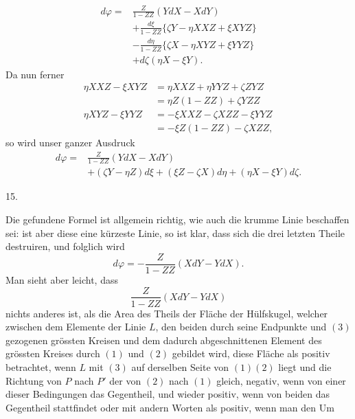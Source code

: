 %
\[
\begin{aligned}
d\varphi={}&\frac{Z}{1-ZZ}(YdX-XdY)\\
&+\frac{d\xi}{1-ZZ}\{\zeta Y-\eta XXZ+\xi XYZ\}\\
&-\frac{d\eta}{1-ZZ}\{\zeta X-\eta XYZ+\xi YYZ\}\\
&+d\zeta(\eta X-\xi Y).
\end{aligned}
\]
Da nun ferner
\[
\begin{aligned}
\eta XXZ-\xi XYZ&=\eta XXZ+\eta YYZ+\zeta ZYZ\\
&=\eta Z(1-ZZ)+\zeta YZZ\\
\eta XYZ-\xi YYZ&=-\xi XXZ-\zeta XZZ-\xi YYZ\\
&=-\xi Z(1-ZZ)-\zeta XZZ,
\end{aligned}
\]
so wird unser ganzer Ausdruck
\[
\begin{aligned}
d\varphi={}&\frac{Z}{1-ZZ}(YdX-XdY)\\
&+(\zeta Y-\eta Z)d\xi+(\xi Z-\zeta X)d\eta+(\eta X-\xi Y)d\zeta.
\end{aligned}
\]

\begin{center}15.\end{center}
\noindent\hspace*{1.2em}Die gefundene Formel ist allgemein richtig, wie auch die krumme Linie beschaffen sei: ist aber diese eine kürzeste Linie, so ist klar, dass sich die drei letzten Theile destruiren, und folglich wird
\[
d\varphi=-\frac{Z}{1-ZZ}(XdY-YdX).
\]
Man sieht aber leicht, dass
\[
\frac{Z}{1-ZZ}(XdY-YdX)
\]
nichts anderes ist, als die Area des Theils der Fläche der Hülfskugel, welcher zwischen dem Elemente der Linie $L$, den beiden durch seine Endpunkte und $(3)$ gezogenen grössten Kreisen und dem dadurch abgeschnittenen Element des grössten Kreises durch $(1)$ und $(2)$ gebildet wird, diese Fläche als positiv betrachtet, wenn $L$ mit $(3)$ auf derselben Seite von $(1)(2)$ liegt und die Richtung von $P$ nach $P'$ der von $(2)$ nach $(1)$ gleich, negativ, wenn von einer dieser Bedingungen das Gegentheil, und wieder positiv, wenn von beiden das Gegentheil stattfindet oder mit andern Worten als positiv, wenn man den Um%
